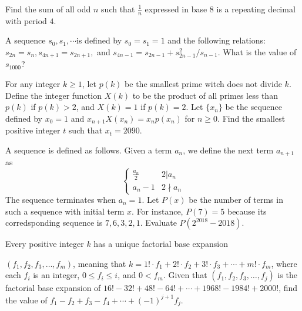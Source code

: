 \documentclass[mast]{lucky}
\begin{document}
\begin{prob}{6}
Find the sum of all odd $n$ such that $\frac{1}{n}$ expressed in base $8$ is a repeating decimal with period $4.$
\end{prob}

\begin{prob}[HMMT 2002]{6}
A sequence $s_0,s_1,\cdots $is defined by $s_0=s_1=1$ and the following relations: $s_{2n}=s_n, s_{4n+1}=s_{2n+1},$ and $s_{4n-1}=s_{2n-1}+s_{2n-1}^2/s_{n-1}$. What is the value of $s_{1000}$?
\end{prob}

\begin{prob}[AIME II 2014/15]{6}
For any integer $k\ge 1$, let $p(k)$ be the smallest prime witch does not divide $k$. Define the integer function $X(k)$ to be the product of all primes less than $p(k)$ if $p(k)>2$, and $X(k)=1$ if $p(k)=2$. Let $\{x_n\}$ be the sequence defined by $x_0=1$ and $x_{n+1}X(x_n)=x_np(x_n)$ for $n\ge 0$. Find the smallest positive integer $t$ such that $x_t=2090$.
\end{prob}

\begin{prob}[SMT 2018]{9}
A sequence is defined as follows. Given a term $a_n$, we define the next term $a_{n+1}$ as \[\begin{cases} 
      \frac{a_n}2 & 2|a_n \\
      a_n-1 & 2\nmid a_n 
   \end{cases}\]The sequence terminates when $a_n=1$. Let $P(x)$ be the number of terms in such a sequence with initial term $x$. For instance, $P(7)=5$ because its corredsponding sequence is $7,6,3,2,1$. Evaluate $P(2^{2018}-2018).$
\end{prob}

\begin{prob}[AIME II 2000/14]{13}
Every positive integer $k$ has a unique factorial base expansion 

$(f_1,f_2,f_3,\ldots,f_m)$, meaning that $k=1!\cdot f_1+2!\cdot f_2+3!\cdot f_3+\cdots+m!\cdot f_m$, where each $f_i$ is an integer, $0\le f_i\le i$, and $0<f_m$. Given that $(f_1,f_2,f_3,\ldots,f_j)$ is the factorial base expansion of $16!-32!+48!-64!+\cdots+1968!-1984!+2000!$, find the value of $f_1-f_2+f_3-f_4+\cdots+(-1)^{j+1}f_j$.
\end{prob}
\end{document}
